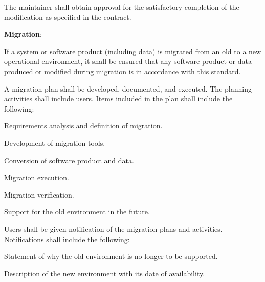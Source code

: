 \begin{adjustwidth}{2em}{0pt}
\begin{compactenum}
\begin{compactenum}
						\item The maintainer shall obtain approval for the satisfactory completion of the modification as specified in the contract.

					\end{compactenum}

					\item {\bf Migration}:

					\begin{compactenum}

						\item If a system or software product (including data) is migrated from an old to a new operational environment, it shall be ensured that any software product or data produced or modified during migration is in accordance with this standard.

						\item A migration plan shall be developed, documented, and executed. The planning activities shall include users. Items included in the plan shall include the following:

						\begin{compactenum}

							\item Requirements analysis and definition of migration.

							\item Development of migration tools.

							\item Conversion of software product and data.

							\item Migration execution.

							\item Migration verification.

							\item Support for the old environment in the future.

						\end{compactenum}

						\item Users shall be given notification of the migration plans and activities. Notifications shall include the following:

						\begin{compactenum}

							\item Statement of why the old environment is no longer to be supported.

							\item Description of the new environment with its date of availability.


\end{compactenum}
\end{compactenum}
\end{compactenum}
\end{adjustwidth}
